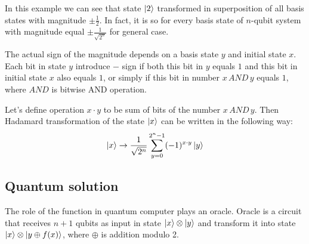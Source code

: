 In this example we can see that state $\ket{2}$ transformed in superposition of all basis states with magnitude $\pm\frac{1}{2}$.
In fact, it is so for every basis state of $n$-qubit system with magnitude equal $\pm\frac{1}{\sqrt {2^n}}$ for general case.

The actual sign of the magnitude depends on a basis state $y$ and initial state $x$.
Each bit in state $y$ introduce $-$ sign if both this bit in $y$ equals $1$ and this bit in initial state $x$ also equals $1$, or simply if this bit in number $x \, AND \, y$ equals $1$, where $AND$ is bitwise AND operation.

Let's define operation $x \cdot y$ to be sum of bits of the number $x \, AND \, y$.
Then Hadamard transformation of the state $\ket{x}$ can be written in the following way:
\begin{align} \label{h_transformation}
    \ket{x} \rightarrow \frac{1}{\sqrt {2^n}} \sum_{y=0}^{2^n-1} (-1)^{x \cdot y} \ket{y}
\end{align}

\subsection{Quantum solution}\label{subsec:dj-quantum-solution}

The role of the function in quantum computer plays an oracle.
Oracle is a circuit that receives $n+1$ qubits as input in state $\ket{x}\otimes\ket{y}$ and transform it into state $\ket{x}\otimes\ket{y\oplus f(x)}$, where $\oplus$ is addition modulo 2.

